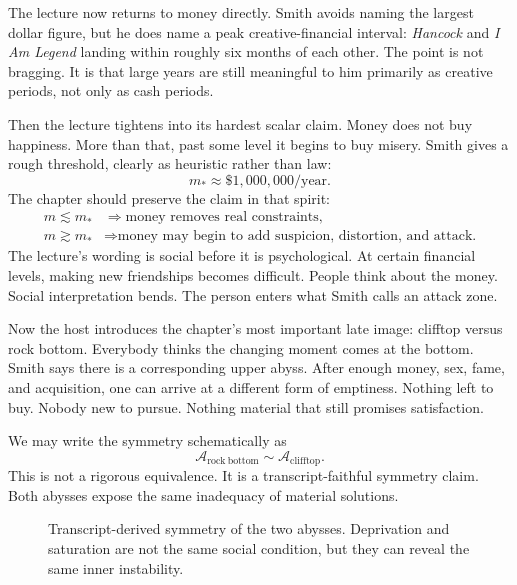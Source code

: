 The lecture now returns to money directly. Smith avoids naming the largest dollar figure, but he does name a peak creative-financial interval: \emph{Hancock} and \emph{I Am Legend} landing within roughly six months of each other. The point is not bragging. It is that large years are still meaningful to him primarily as creative periods, not only as cash periods.

Then the lecture tightens into its hardest scalar claim. Money does not buy happiness. More than that, past some level it begins to buy misery. Smith gives a rough threshold, clearly as heuristic rather than law:
\begin{equation}
m_\ast \approx \$1{,}000{,}000/\text{year}.
\end{equation}
The chapter should preserve the claim in that spirit:
\begin{align}
m \lesssim m_\ast
&\Rightarrow
\text{money removes real constraints},\\
m \gtrsim m_\ast
&\Rightarrow
\text{money may begin to add suspicion, distortion, and attack.}
\end{align}
The lecture's wording is social before it is psychological. At certain financial levels, making new friendships becomes difficult. People think about the money. Social interpretation bends. The person enters what Smith calls an attack zone.

Now the host introduces the chapter's most important late image: clifftop versus rock bottom. Everybody thinks the changing moment comes at the bottom. Smith says there is a corresponding upper abyss. After enough money, sex, fame, and acquisition, one can arrive at a different form of emptiness. Nothing left to buy. Nobody new to pursue. Nothing material that still promises satisfaction.

We may write the symmetry schematically as
\begin{equation}
\mathcal A_{\mathrm{rock\ bottom}}
\sim
\mathcal A_{\mathrm{clifftop}}.
\end{equation}
This is not a rigorous equivalence. It is a transcript-faithful symmetry claim. Both abysses expose the same inadequacy of material solutions.

\begin{figure}[h]
\centering
{}
\caption{Transcript-derived symmetry of the two abysses. Deprivation and saturation are not the same social condition, but they can reveal the same inner instability.}
\end{figure}

